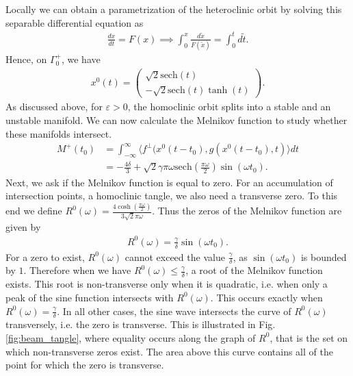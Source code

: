 \begin{ex}
Locally we can obtain a parametrization of the heteroclinic orbit by solving this separable differential equation as
\begin{align}
	\frac{dx}{dt} = F(x) \implies \int_{0}^{x}  \frac{d \tilde{x}}{F(\tilde{x})} = \int_{0}^{t} d \tilde{t}.
\end{align}
Hence, on $\Gamma_{0}^{+}$, we have 
\begin{align}
	x^0(t) = 
	\begin{pmatrix}
		\sqrt{2}  \textrm{sech}(t) \\  -\sqrt{2}  \textrm{sech} (t) \tanh(t)
	\end{pmatrix}
.	
\end{align}
As discussed above, for $\varepsilon > 0$, the homoclinic orbit splits into a stable and an unstable manifold. We can now calculate the Melnikov function to study whether these manifolds intersect.
\begin{subequations}
\begin{align}
	M^{+}(t_0) &= \int_{-\infty }^{\infty }\langle f^{\perp}(x^{0}(t-t_0), g(x^{0}(t-t_0), t) \rangle dt \\
		   &= - \frac{4 \delta }{3} + \sqrt{2} \gamma \pi \omega  \textrm{sech} \left( \frac{\pi \omega }{2}\right)\sin(\omega t_0). 
\end{align}
\end{subequations}
Next, we ask if the Melnikov function is equal to zero. For an accumulation of intersection points, a homoclinic tangle, we also need a transverse zero. To this end we define $R^{0}(\omega) = \frac{4 \cosh \left( \frac{\pi \omega }{2}\right)}{3 \sqrt{2} \pi \omega }$. Thus the zeros of the Melnikov function are given by
 \begin{align}
	 R^{0}(\omega) = \frac{\gamma }{\delta} \sin(\omega t_0).
\end{align}
For a zero to exist, $R^{0}(\omega)$ cannot exceed the value $\frac{\gamma }{\delta}$, as $\sin(\omega t_0)$ is bounded by $1$. Therefore when we have $R^{0}(\omega) \leq \frac{\gamma }{\delta }$, a root of the Melnikov function exists. This root is non-transverse only when it is quadratic, i.e. when only a peak of the sine function intersects with $R^{0}(\omega) $. This occurs exactly when $R ^{0}(\omega)=\frac{\gamma }{\delta}$. In all other cases, the sine wave intersects the curve of $R^{0}(\omega) $ transversely, i.e. the zero is transverse. This is illustrated in Fig. \ref{fig:beam_tangle}, where equality occurs along the graph of $R^{0}$, that is the set on which non-transverse zeros exist. The area above this curve contains all of the point for which the zero is transverse.

\end{ex}
